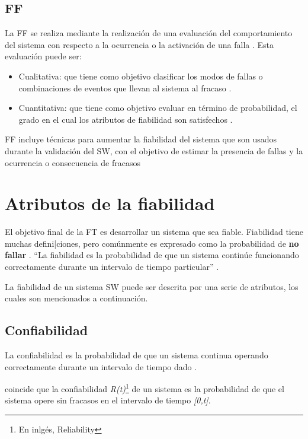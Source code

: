 \subsection{\acl{FF}}
La \ac{FF} se realiza mediante la realización de una evaluación del comportamiento del sistema con
respecto a la ocurrencia o la activación de una falla \citep{FTDesign}. Esta evaluación puede ser:
\begin{itemize}
 \item Cualitativa: que tiene como objetivo clasificar los modos de fallas o combinaciones de
eventos que llevan al sistema al fracaso \citep{FTDesign}.
 \item Cuantitativa: que tiene como objetivo evaluar en término de probabilidad, el grado en el
cual los atributos de fiabilidad son satisfechos \citep{FTDesign}.
\end{itemize}

\ac{FF} incluye técnicas para aumentar la fiabilidad del sistema que son usados durante la
validación del \ac{SW}, con el objetivo de estimar la presencia de fallas y la ocurrencia o
consecuencia de fracasos \citep{Pullum01}

\section{Atributos de la fiabilidad}\label{sec:atributos_de_la_fiabilidad}
El objetivo final de la \ac{FT} es desarrollar un sistema que sea fiable. Fiabilidad tiene muchas
defini|ciones, pero comúnmente es expresado como la probabilidad de \textbf{no fallar}
\citep{FTAvionics}. ``La fiabilidad es la probabilidad de que un sistema continúe funcionando
correctamente durante un intervalo de tiempo particular'' \citep{SoftwareFaultToleranceATutorial}.

La fiabilidad de un sistema \ac{SW} puede ser descrita por una serie de atributos, los cuales son
mencionados a continuación.

\subsection{Confiabilidad}\label{subsec:confiabilidad}
La confiabilidad es la probabilidad de que un sistema continua operando correctamente durante un
intervalo de tiempo dado \citep{SoftwareFaultToleranceATutorial}.

\cite{FTDesign} coincide que la confiabilidad \textit{R(t)}\footnote{En inlgés, Reliability} de un
sistema es la probabilidad de que el sistema opere sin fracasos en el intervalo de tiempo
\textit{[0,t]}.

